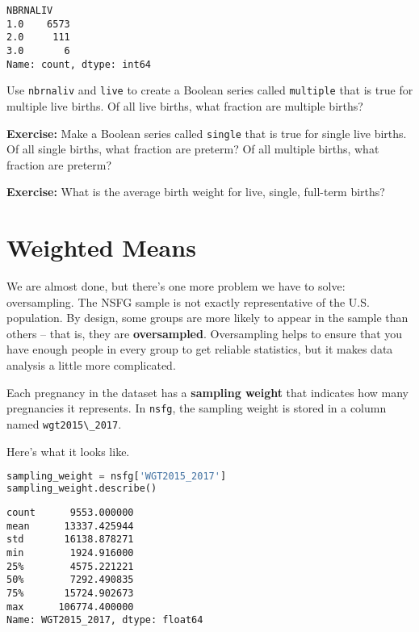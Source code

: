 \begin{lstlisting}[style=output]
NBRNALIV
1.0    6573
2.0     111
3.0       6
Name: count, dtype: int64
\end{lstlisting}

Use \passthrough{\lstinline!nbrnaliv!} and
\passthrough{\lstinline!live!} to create a Boolean series called
\passthrough{\lstinline!multiple!} that is true for multiple live
births. Of all live births, what fraction are multiple births?

\textbf{Exercise:} Make a Boolean series called
\passthrough{\lstinline!single!} that is true for single live births. Of
all single births, what fraction are preterm? Of all multiple births,
what fraction are preterm?

\textbf{Exercise:} What is the average birth weight for live, single,
full-term births?

\section{Weighted Means}\label{weighted-means}

We are almost done, but there's one more problem we have to solve:
oversampling. The NSFG sample is not exactly representative of the U.S.
population. By design, some groups are more likely to appear in the
sample than others -- that is, they are \textbf{oversampled}.
Oversampling helps to ensure that you have enough people in every group
to get reliable statistics, but it makes data analysis a little more
complicated.

Each pregnancy in the dataset has a \textbf{sampling weight} that
indicates how many pregnancies it represents. In
\passthrough{\lstinline!nsfg!}, the sampling weight is stored in a
column named \passthrough{\lstinline!wgt2015\_2017!}.

\pagebreak

Here's what it looks like.

\begin{lstlisting}[language=Python,style=source]
sampling_weight = nsfg['WGT2015_2017']
sampling_weight.describe()
\end{lstlisting}

\begin{lstlisting}[style=output]
count      9553.000000
mean      13337.425944
std       16138.878271
min        1924.916000
25%        4575.221221
50%        7292.490835
75%       15724.902673
max      106774.400000
Name: WGT2015_2017, dtype: float64
\end{lstlisting}

